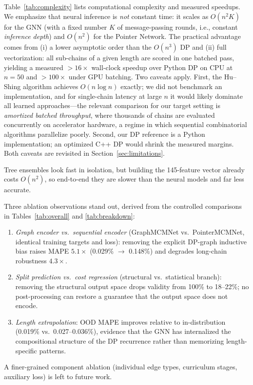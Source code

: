 \documentclass[conference]{IEEEtran}
\begin{document}
Table~\ref{tab:complexity} lists computational complexity and measured
speedups. We emphasize that neural inference is \emph{not} constant time: it
scales as $O(n^2 K)$ for the GNN (with a fixed number $K$ of message-passing
rounds, i.e., constant \emph{inference depth}) and $O(n^2)$ for the Pointer
Network. The practical advantage comes from (i) a lower asymptotic order than
the $O(n^3)$ DP and (ii) full vectorization: all sub-chains of a given length
are scored in one batched pass, yielding a measured ${>}16\times$ wall-clock
speedup over Python DP on CPU at $n{=}50$ and ${>}100\times$ under GPU
batching. Two caveats apply. First, the Hu--Shing algorithm achieves
$O(n \log n)$ exactly; we did not benchmark an implementation, and for
single-chain latency at large $n$ it would likely dominate all learned
approaches---the relevant comparison for our target setting is
\emph{amortized batched throughput}, where thousands of chains are evaluated
concurrently on accelerator hardware, a regime in which sequential
combinatorial algorithms parallelize poorly. Second, our DP reference is a
Python implementation; an optimized C++ DP would shrink the measured margins.
Both caveats are revisited in Section~\ref{sec:limitations}.

Tree ensembles look fast in isolation, but building the 145-feature vector
already costs $O(n^2)$, so end-to-end they are slower than the neural models
and far less accurate.

Three ablation observations stand out, derived from the controlled
comparisons in Tables~\ref{tab:overall} and \ref{tab:breakdown}:
\begin{enumerate}
    \item \emph{Graph encoder vs.\ sequential encoder} (GraphMCMNet vs.\
    PointerMCMNet, identical training targets and loss): removing the explicit
    DP-graph inductive bias raises MAPE $5.1\times$ (0.029\% $\to$ 0.148\%)
    and degrades long-chain robustness $4.3\times$.
    \item \emph{Split prediction vs.\ cost regression} (structural vs.\
    statistical branch): removing the structural output space drops validity
    from 100\% to 18--22\%; no post-processing can restore a guarantee that
    the output space does not encode.
    \item \emph{Length extrapolation}: OOD MAPE improves relative to
    in-distribution (0.019\% vs.\ 0.027--0.036\%), evidence that the GNN has
    internalized the compositional structure of the DP recurrence rather than
    memorizing length-specific patterns.
\end{enumerate}
A finer-grained component ablation (individual edge types, curriculum stages,
auxiliary loss) is left to future work.
\end{document}

